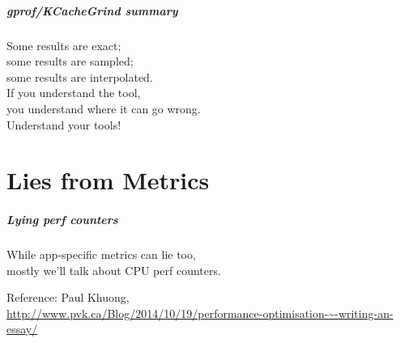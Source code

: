 \documentclass[aspectratio=43]{beamer}
\newenvironment{changemargin}[1]{%
  \begin{list}{}{%
    \setlength{\topsep}{0pt}%
    \setlength{\leftmargin}{#1}%
    \setlength{\rightmargin}{1em}
    \setlength{\listparindent}{\parindent}%
    \setlength{\itemindent}{\parindent}%
    \setlength{\parsep}{\parskip}%
  }%
  \item[]}{\end{list}}
\begin{document}
\begin{frame}
  \frametitle{gprof/KCacheGrind summary}
  \begin{changemargin}{2cm}
    Some results are exact;\\
    some results are sampled;\\
    some results are interpolated.\\[1em]

    If you understand the tool, \\
    you understand where it can go wrong.\\[1em]

    Understand your tools!
  \end{changemargin}
\end{frame}

\part{Lies from Metrics}

\begin{frame}
  \partpage
\end{frame}

\begin{frame}
  \frametitle{Lying perf counters}
  
  \begin{changemargin}{2cm}
    While app-specific metrics can lie too,\\
    mostly we'll talk about CPU perf counters.
  \end{changemargin}

  \begin{center}
    Reference: Paul Khuong,\\
  \tiny
  \url{http://www.pvk.ca/Blog/2014/10/19/performance-optimisation-~-writing-an-essay/}

  \end{center}

\end{frame}
\end{document}
